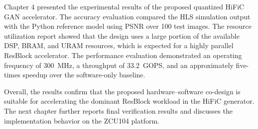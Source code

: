 Chapter 4 presented the experimental results of the proposed quantized HiFiC GAN accelerator. The accuracy evaluation compared the HLS simulation output with the Python reference model using PSNR over 100 test images. The resource utilization report showed that the design uses a large portion of the available DSP, BRAM, and URAM resources, which is expected for a highly parallel ResBlock accelerator. The performance evaluation demonstrated an operating frequency of 300~MHz, a throughput of 33.2~GOPS, and an approximately five-times speedup over the software-only baseline.

Overall, the results confirm that the proposed hardware--software co-design is suitable for accelerating the dominant ResBlock workload in the HiFiC generator. The next chapter further reports final verification results and discusses the implementation behavior on the ZCU104 platform.
